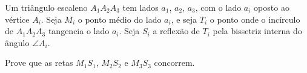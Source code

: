 Um triângulo escaleno $A_{1}A_{2}A_{3}$ tem lados $a_{1}$,  $a_{2}$,  $a_{3}$, com o lado $a_{i}$ oposto ao vértice $A_{i}$. Seja $M_{i}$ o ponto médio do lado $a_{i}$, e seja $T_{i}$ o ponto onde o incírculo de $A_{1}A_{2}A_{3}$ tangencia o lado $a_{i}$. Seja $S_{i}$ a reflexão de $T_{i}$ pela bissetriz interna do ângulo $\angle A_{i}$.

Prove que as retas $M_{1}S_{1}$, $M_{2}S_{2}$ e $M_{3}S_{3}$ concorrem.
